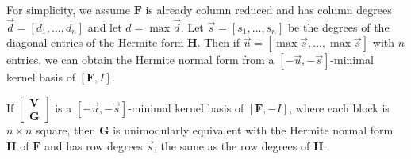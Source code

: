 For simplicity, we assume $\mathbf{F}$ is already column reduced
and has column degrees $\vec{d}=\left[d_{1},\dots,d_{n}\right]$ and
let $d=\max\vec{d}$. Let $\vec{s}=\left[s_{1},\dots,s_{n}\right]$
be the degrees of the diagonal entries of the Hermite form $\mathbf{H}$.
Then if $\vec{u}=\left[\max\vec{s},\dots,\max\vec{s}\right]$ with
$n$ entries, we can obtain the Hermite normal form from a $\left[-\vec{u},-\vec{s}\right]$-minimal
kernel basis of $\left[\mathbf{F},I\right]$.
\begin{lem}
If $\begin{bmatrix}\mathbf{V}\\
\mathbf{G}
\end{bmatrix}$ is a $\left[-\vec{u},-\vec{s}\right]$-minimal kernel basis of $\left[\mathbf{F},-I\right]$,
where each block is $n\times n$ square, then $\mathbf{G}$ is unimodularly
equivalent with the Hermite normal form $\mathbf{H}$ of $\mathbf{F}$
and has row degrees $\vec{s}$, the same as the row degrees of $\mathbf{H}$.\end{lem}
